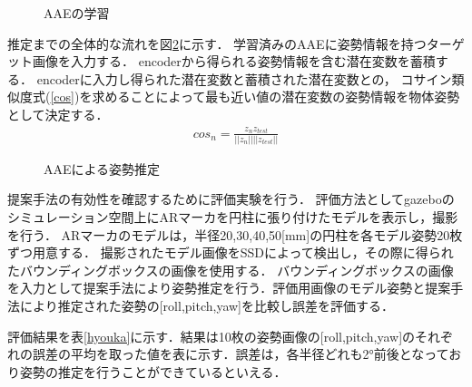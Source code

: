 \documentclass{jsarticle}
\begin{document}
\begin{figure}[ht]
\vspace{-7zh}
\setlength{\epsfxsize}{7.5cm}
\centerline{}
\vspace{5zh}
\caption{AAEの学習}
\label{BB}
\vspace{-1.0zh}
\end{figure}




推定までの全体的な流れを図\ref{GG}に示す．
学習済みのAAEに姿勢情報を持つターゲット画像を入力する．
encoderから得られる姿勢情報を含む潜在変数を蓄積する．
encoderに入力し得られた潜在変数と蓄積された潜在変数との，
コサイン類似度式(\ref{cos})を求めることによって最も近い値の潜在変数の姿勢情報を物体姿勢として決定する．
\begin{eqnarray}
\label{cos}
cos_n=\frac{z_n z_{test}}{||z_n|| ||z_{test}||}
\end{eqnarray}


\begin{figure}[ht]
\vspace{-5zh}
\setlength{\epsfxsize}{7.5cm}
\centerline{}
\vspace{5zh}
\caption{AAEによる姿勢推定}
\label{GG}
\vspace{-1.0zh}
\end{figure}





提案手法の有効性を確認するために評価実験を行う．
評価方法としてgazeboのシミュレーション空間上にARマーカを円柱に張り付けたモデルを表示し，撮影を行う．
ARマーカのモデルは，半径20,30,40,50[mm]の円柱を各モデル姿勢20枚ずつ用意する．
撮影されたモデル画像をSSDによって検出し，その際に得られたバウンディングボックスの画像を使用する．
バウンディングボックスの画像を入力として提案手法により姿勢推定を行う．評価用画像のモデル姿勢と提案手法により推定された姿勢の[roll,pitch,yaw]を比較し誤差を評価する．

評価結果を表\ref{hyouka}に示す．結果は10枚の姿勢画像の[roll,pitch,yaw]のそれぞれの誤差の平均を取った値を表に示す．誤差は，各半径どれも2°前後となっており姿勢の推定を行うことができているといえる．
\end{document}
